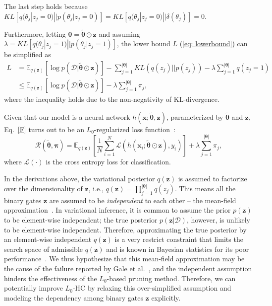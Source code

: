 \documentclass[runningheads, envcountsame, a4paper]{llncs}
\def\bs{\boldsymbol}
\begin{document}
The last step holds because $KL[q(\theta_j | z_j=0) || p(\theta_j|z_j=0)]=KL[q(\theta_j | z_j=0) || \delta(\theta_j)]=0$.

Furthermore, letting $\bs{\theta} = \tilde{\bs{\theta}} \odot \bs{z}$ and assuming $\lambda = KL[q(\theta_j | z_j=1) || p(\theta_j |z_j=1)]$, the lower bound $L$ (\ref{eq: lowerbound}) can be simplified as
\begin{align}
  L &= \mathbb{E}_{q(\bs{z})}[\log p(\mathcal{D} | \tilde{\bs{\theta}} \odot \bs{z})] - \sum_{j=1}^{|\bs{\theta}|} K L\left(q\left({z}_{j}\right)|| p\left({z}_{j}\right)\right)-\lambda \sum_{j=1}^{|\bs{\theta}|} q\left({z}_{j}=1\right) \nonumber\\
  & \leq\mathbb{E}_{q(\bs{z})}[\log p(\mathcal{D} | \tilde{\bs{\theta}} \odot \bs{z})]-\lambda \sum_{j=1}^{|\bs{\theta}|} \pi_{j}, \label{F}
\end{align}
where the inequality holds due to the non-negativity of KL-divergence.

Given that our model is a neural network $h(\bs x;\tilde{\bs{ \theta}}, \bs{z})$, parameterized by $\tilde{\bs{\theta}}$ and $\bs{z}$, Eq.~\ref{F} turns out to be an $L_0$-regularized loss function~\cite{louizos2017learning}:
\begin{equation} \label{risk}
  \mathcal{R}(\tilde{\bs{\theta}}, \bs{\pi})=\mathbb{E}_{q(\bs{z} )}\left[\frac{1}{N}\sum_{i=1}^{N} \mathcal{L}\left(h(\bs{x}_{i} ; \tilde{\bs{\theta}} \odot \bs{z}), y_i\right)\right]+\lambda \sum_{j=1}^{|\bs{\theta}|} \pi_{j},
\end{equation}
where $\mathcal{L}(\cdot)$ is the cross entropy loss for classification.

In the derivations above, the variational posterior $q(\bs{z})$ is assumed to factorize over the dimensionality of $\bs{z}$, i.e., $q(\bs{z})=\prod_{j=1}^{|\bs{\theta}|}q(z_j)$. This means all the binary gates $\bs{z}$ are assumed to be \textit{independent} to each other -- the mean-field approximation~\cite{viBlei}. In variational inference, it is common to assume the prior $p(\bs{z})$ to be element-wise independent; the true posterior $p(\bs{z}|\mathcal{D})$, however, is unlikely to be element-wise independent. Therefore, approximating the true posterior by an element-wise independent $q(\bs{z})$ is a very restrict constraint that limits the search space of admissible $q(\bs{z})$ and is known in Bayesian statistics for its poor performance~\cite{bishop2007,viBlei}. We thus hypothesize that this mean-field approximation may be the cause of the failure reported by Gale et al.~\cite{gale2019state}, and the independent assumption hinders the effectiveness of the $L_0$-based pruning method. Therefore, we can potentially improve $L_0$-HC by relaxing this over-simplified assumption and modeling the dependency among binary gates $\bs{z}$ explicitly. 
\end{document}
